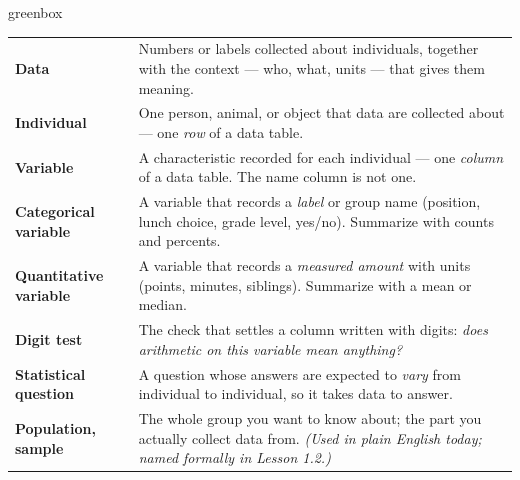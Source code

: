 \documentclass[10pt]{article}
\begin{document}
\boxguard[24]
\begin{skillbox}{greenbox}
\small
\renewcommand{\arraystretch}{1.35}
\begin{tabularx}{\linewidth}{@{} >{\bfseries}p{3.1cm} X @{}}
Data & Numbers or labels collected about individuals, together with the context --- who,
       what, units --- that gives them meaning. \\
Individual & One person, animal, or object that data are collected about --- one \emph{row}
       of a data table. \\
Variable & A characteristic recorded for each individual --- one \emph{column} of a data
       table. The name column is not one. \\
Categorical variable & A variable that records a \emph{label} or group name (position, lunch
       choice, grade level, yes/no). Summarize with counts and percents. \\
Quantitative variable & A variable that records a \emph{measured amount} with units (points,
       minutes, siblings). Summarize with a mean or median. \\
Digit test & The check that settles a column written with digits: \emph{does arithmetic on
       this variable mean anything?} \\
Statistical question & A question whose answers are expected to \emph{vary} from individual
       to individual, so it takes data to answer. \\
Population, sample & The whole group you want to know about; the part you actually collect
       data from. \emph{(Used in plain English today; named formally in Lesson 1.2.)} \\
\end{tabularx}
\end{skillbox}
\end{document}
